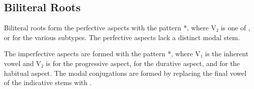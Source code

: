 \documentclass[grammar]{subfiles}
\begin{document}
\subsection{Biliteral Roots}
\label{ssec:vm_viii_biliteral_roots}

Biliteral roots form the perfective aspects with the pattern *,
where V₂ is one of ,  or  for the various subtypes.  The
perfective aspects lack a distinct modal stem. 

The imperfective aspects are formed with the pattern *, where V₁
is the inherent vowel and V₂ is  for the progressive aspect,  for
the durative aspect, and  for the habitual aspect.  The modal
conjugations are formed by replacing the final vowel of the indicative stems
with . 



\end{document}
